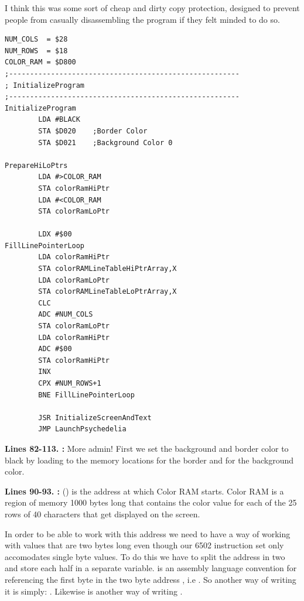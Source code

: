 I think this was some sort of cheap and dirty copy protection, designed to prevent people from casually disassembling the
program if they felt minded to do so. 

\clearpage
\begin{lstlisting}[caption=The initialization routine - visited only once\, at the very start of execution]
NUM_COLS  = $28
NUM_ROWS  = $18
COLOR_RAM = $D800
;-------------------------------------------------------
; InitializeProgram
;-------------------------------------------------------
InitializeProgram   
        LDA #BLACK
        STA $D020    ;Border Color
        STA $D021    ;Background Color 0

PrepareHiLoPtrs
        LDA #>COLOR_RAM
        STA colorRamHiPtr
        LDA #<COLOR_RAM
        STA colorRamLoPtr

        LDX #$00
FillLinePointerLoop
        LDA colorRamHiPtr
        STA colorRAMLineTableHiPtrArray,X
        LDA colorRamLoPtr
        STA colorRAMLineTableLoPtrArray,X
        CLC 
        ADC #NUM_COLS
        STA colorRamLoPtr
        LDA colorRamHiPtr
        ADC #$00
        STA colorRamHiPtr
        INX 
        CPX #NUM_ROWS+1
        BNE FillLinePointerLoop

        JSR InitializeScreenAndText
        JMP LaunchPsychedelia

\end{lstlisting}
\clearpage

\textbf{Lines 82-113. :} More admin!  First we set the background and border color to black by loading
 to the memory locations  for the border and  for the background color.

\bigskip
\bigskip
\textbf{Lines 90-93. :}  () is the address at which Color RAM starts. Color
RAM is a region of memory 1000 bytes long that contains the color value for each of the 25 rows of 40 characters that get displayed on the
screen. 

In order to be able to work with this address we need to have a way of working with values that are two bytes long even though
our 6502 instruction set only accomodates single byte values. To do this we have to split the address in two and store each half in 
a separate variable.  is an assembly language convention for referencing the first byte in the two byte address
, i.e . So another way of writing it is simply: . Likewise  is
another way of writing . 

